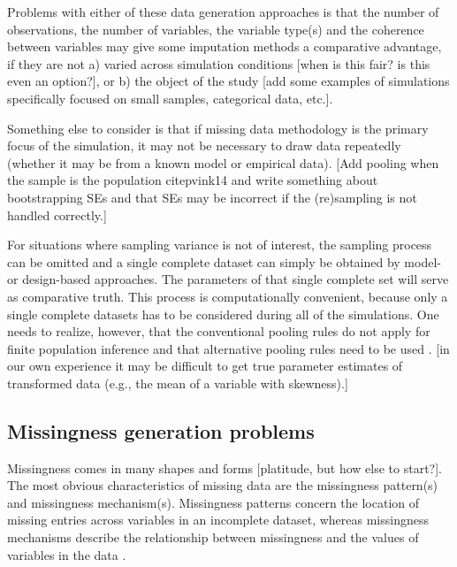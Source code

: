 \documentclass[bimj,fleqn]{w-art}
\theoremstyle{plain}
\theoremstyle{definition}
\begin{document}

Problems with either of these data generation approaches is that the number of observations, the number of variables, the variable type(s) and the coherence between variables may give some imputation methods a comparative advantage, if they are not a) varied across simulation conditions [when is this fair? is this even an option?], or b) the object of the study [add some examples of simulations specifically focused on small samples, categorical data, etc.].

Something else to consider is that if missing data methodology is the primary focus of the simulation, it may not be necessary to draw data repeatedly (whether it may be from a known model or empirical data). [Add pooling when the sample is the population citep{vink14} and write something about bootstrapping SEs and that SEs may be incorrect if the (re)sampling is not handled correctly.] 

For situations where sampling variance is not of interest, the sampling process can be omitted and a single complete dataset can simply be obtained by model- or design-based approaches. The parameters of that single complete set will serve as comparative truth. This process is computationally convenient, because only a single complete datasets has to be considered during all of the simulations. One needs to realize, however, that the conventional pooling rules \citep[cf.][p. 76-77]{rubi87} do not apply for finite population inference and that alternative pooling rules need to be used \citep{raghunathan2003multiple,vink14}. [in our own experience it may be difficult to get true parameter estimates of transformed data (e.g., the mean of a variable with skewness).]



\subsection{Missingness generation problems}

Missingness comes in many shapes and forms [platitude, but how else to start?]. The most obvious characteristics of missing data are the missingness pattern(s) and missingness mechanism(s). Missingness patterns concern the location of missing entries across variables in an incomplete dataset, whereas missingness mechanisms describe the relationship between missingness and the values of variables in the data \citep[][p. 8]{litt20}.
\end{document}
